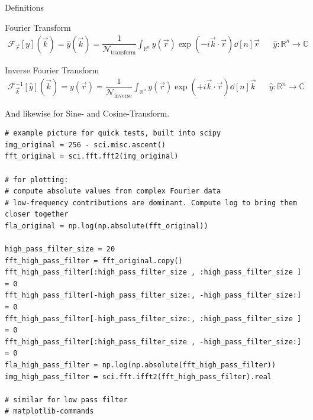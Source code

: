 \begin{frame}{Definitions}
%
\begin{defbox}
\small
Fourier Transform
\begin{align*}
	\mathcal{F}_{\vec{r}}[y](\vec{k})
=
	\hat{y}(\vec{k})
=
	\dfrac{1}{\mathcal{N}_{\text{transform}}}	
	\int_{\mathbb{R}^n}
		y(\vec{r}) \exp(-i\vec{k} \cdot \vec{r}) \dd[n]{\vec{r}}
&&
	\hat{y}: \mathbb{R}^{n} \to \mathbb{C}
\end{align*}


Inverse Fourier Transform
\begin{align*}
	\mathcal{F}_{\vec{k}}^{-1}[\hat{y}](\vec{k})
=
	y(\vec{r})
=
	\dfrac{1}{\mathcal{N}_{\text{inverse}}}	
	\int_{\mathbb{R}^n}
		y(\vec{r}) \exp(+i\vec{k} \cdot \vec{r}) \dd[n]{\vec{k}}
&&
	\hat{y}: \mathbb{R}^{n} \to \mathbb{C}
\end{align*}

And likewise for Sine- and Cosine-Transform.
\end{defbox}
%
\end{frame}


\begin{frame}[fragile]
%
\begin{codebox}
\begin{verbatim}
# example picture for quick tests, built into scipy
img_original = 256 - sci.misc.ascent()
fft_original = sci.fft.fft2(img_original)

# for plotting:
# compute absolute values from complex Fourier data
# low-frequency contributions are dominant. Compute log to bring them closer together
fla_original = np.log(np.absolute(fft_original))

high_pass_filter_size = 20
fft_high_pass_filter = fft_original.copy()
fft_high_pass_filter[:high_pass_filter_size , :high_pass_filter_size ] = 0
fft_high_pass_filter[-high_pass_filter_size:, -high_pass_filter_size:] = 0
fft_high_pass_filter[-high_pass_filter_size:, :high_pass_filter_size ] = 0
fft_high_pass_filter[:high_pass_filter_size , -high_pass_filter_size:] = 0
fla_high_pass_filter = np.log(np.absolute(fft_high_pass_filter))
img_high_pass_filter = sci.fft.ifft2(fft_high_pass_filter).real

# similar for low pass filter
# matplotlib-commands
\end{verbatim}
\end{codebox}
%
\end{frame}

